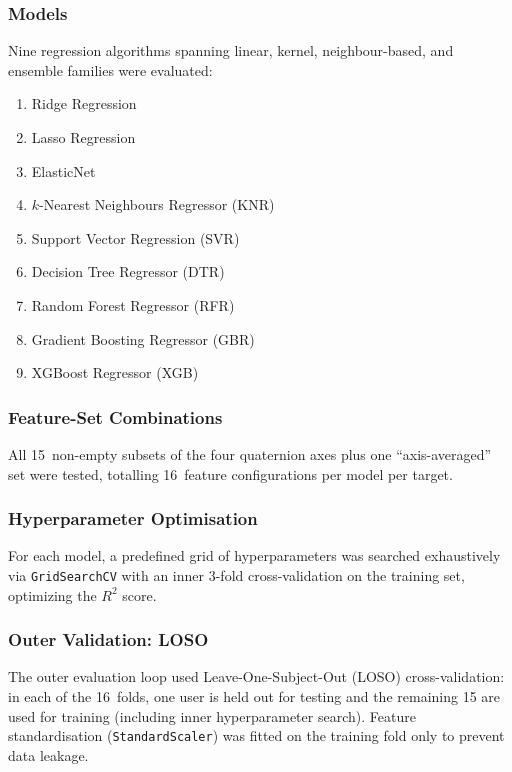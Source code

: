 \subsubsection{Models}

Nine regression algorithms spanning linear, kernel, neighbour-based, and ensemble families were evaluated:
\begin{enumerate}
\item Ridge Regression
\item Lasso Regression
\item ElasticNet
\item $k$-Nearest Neighbours Regressor (KNR)
\item Support Vector Regression (SVR)
\item Decision Tree Regressor (DTR)
\item Random Forest Regressor (RFR)
\item Gradient Boosting Regressor (GBR)
\item XGBoost Regressor (XGB)
\end{enumerate}

\subsubsection{Feature-Set Combinations}

All 15~non-empty subsets of the four quaternion axes plus one ``axis-averaged'' set were tested, totalling 16~feature configurations per model per target.

\subsubsection{Hyperparameter Optimisation}

For each model, a predefined grid of hyperparameters was searched exhaustively via \texttt{GridSearchCV} with an inner 3-fold cross-validation on the training set, optimizing the $R^{2}$ score.

\subsubsection{Outer Validation: LOSO}

The outer evaluation loop used Leave-One-Subject-Out (LOSO) cross-validation: in each of the 16~folds, one user is held out for testing and the remaining 15 are used for training (including inner hyperparameter search). Feature standardisation (\texttt{StandardScaler}) was fitted on the training fold only to prevent data leakage.

